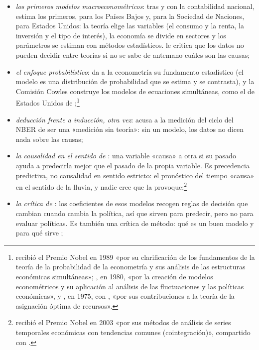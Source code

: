 \documentclass[11pt]{article}
\begin{document}
\begin{itemize}
  \begin{itemize}
  \item \emph{los primeros modelos macroeconométricos}: tras  y con la contabilidad nacional,  estima los primeros, para los Países Bajos y, para la Sociedad de Naciones, para Estados Unidos\nocite{Tinbergen1939Statistical}: la teoría elige las variables (el consumo y la renta, la inversión y el tipo de interés), la economía se divide en sectores y los parámetros se estiman con métodos estadísticos. \textcite{Keynes1939Tinbergen} le critica que los datos no pueden decidir entre teorías si no se sabe de antemano cuáles son las causas;
  \item \emph{el enfoque probabilístico}: \textcite{Haavelmo1944Probability} da a la econometría su fundamento estadístico (el modelo es una distribución de probabilidad que se estima y se contrasta), y la Comisión Cowles construye los modelos de ecuaciones simultáneas, como el de Estados Unidos de \textcite{KleinGoldberger1955Econometric} ;\footnote{ recibió el Premio Nobel en 1989 «por su clarificación de los fundamentos de la teoría de la probabilidad de la econometría y sus análisis de las estructuras económicas simultáneas»\nocite{Nobel1989Haavelmo}; , en 1980, «por la creación de modelos econométricos y su aplicación al análisis de las fluctuaciones y las políticas económicas»\nocite{Nobel1980Klein}, y , en 1975, con , «por sus contribuciones a la teoría de la asignación óptima de recursos»\nocite{NobelPrize1975Koopmans}.}
  \item \emph{deducción frente a inducción, otra vez}: \textcite{Koopmans1947Measurement} acusa a la medición del ciclo del NBER\nocite{BurnsMitchell1946} de ser una «medición sin teoría»: sin un modelo, los datos no dicen nada sobre las causas;
  \item \emph{la causalidad en el sentido de \textcite{Granger1969Investigating}}: una variable «causa» a otra si su pasado ayuda a predecirla mejor que el pasado de la propia variable. Es precedencia predictiva, no causalidad en sentido estricto: el pronóstico del tiempo «causa» en el sentido de  la lluvia, y nadie cree que la provoque;\footnote{ recibió el Premio Nobel en 2003 «por sus métodos de análisis de series temporales económicas con tendencias comunes (cointegración)», compartido con \nocite{Nobel2003EngleGranger}.}
  \item \emph{la crítica de \textcite{Lucas1976Econometric}}: los coeficientes de esos modelos recogen reglas de decisión que cambian cuando cambia la política, así que sirven para predecir, pero no para evaluar políticas. Es también una crítica de método: qué es un buen modelo y para qué sirve ;

\end{itemize}
\end{itemize}
\end{document}
